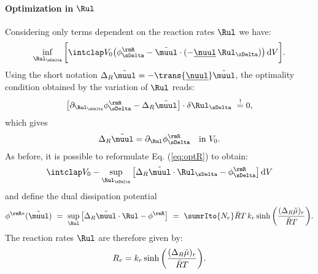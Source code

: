 \paragraph{Optimization in $\Rul$} \label{sec:optR} %
Considering only terms dependent on the reaction rates $\Rul$ we have:
\begin{align}
  \inf_{\RulDelta} \bigg[ \intVO \big( \phiRDelta - \muultilde \cdot (-\nuull\,\RulDelta) \big) \dV \bigg].
  \label{eq:optR}
\end{align}
Using the short notation $\Delta_R\muultilde=-\trans{\nuull}\muultilde$, the optimality condition obtained by the variation of $\Rul$ reads:
\begin{align}
  \big[\dRulDelta\phiRDelta-\Delta_R\muultilde\big] \cdot\delta\RulDelta \ \stackrel{!}{=} 0,
\end{align}
which gives
\begin{align}
  \Delta_R\muultilde = \dRul \phiRDelta \quad \text{in} \ V_0.
\end{align}
As before, it is possible to reformulate Eq. (\ref{eq:optR}) to obtain:
\begin{align}
  \intVO -\sup_{\RulDelta}\big[ \Delta_R \muultilde \cdot \RulDelta - \phiRDelta \big]\dV
\end{align}
and define the dual dissipation potential 
\begin{align}
  \phiRs(\muultilde) \ = \ \sup_{\Rul}\big[\Delta_R \muultilde \cdot \Rul-\phiR\big] \ = \ \sumrIto{N_r} \RT \,k_r\sinh\bigg(\frac{(\Delta_R\tilde\mu)_r}{\RT}\bigg).
\end{align}
The reaction rates $\Rul$ are therefore given by:
\begin{align}
  R_r = k_r \sinh\bigg(\frac{(\Delta_R\tilde\mu)_r}{\bar{R}T}\bigg).
\end{align}

